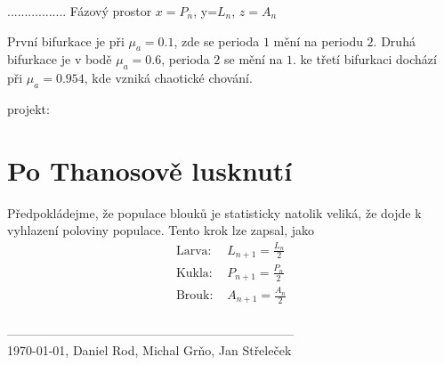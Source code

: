 \documentclass[a4paper, 12pt]{article}
\begin{document}
.................
Fázový prostor $x=P_n$, y=$L_n$, $z=A_n$

První bifurkace je při $\mu_a=0.1$, zde se perioda $1$ mění na periodu $2$. Druhá bifurkace je v bodě $\mu_a=0.6$, perioda $2$ se mění na $1$. ke třetí bifurkaci dochází při $\mu_a=0.954$, kde vzniká chaotické chování.

projekt: 

\section{Po Thanosově lusknutí}
Předpokládejme, že populace blouků je statisticky natolik veliká, že dojde k vyhlazení poloviny populace.
Tento krok lze zapsal, jako
\begin{equation}
  \begin{split}
\text{Larva: }& L_{n+1}=\frac{L_n}{2} \\
\text{Kukla: }& P_{n+1}=\frac{P_n}{2} \\
\text{Brouk: }& A_{n+1}=\frac{A_n}{2} \\
  \end{split}
\end{equation}


---------------------------------------------------------------------\\
\today, Daniel Rod, Michal Grňo, Jan Střeleček
\end{document}
